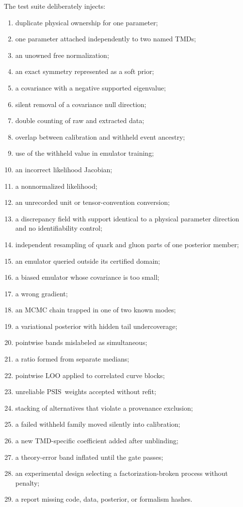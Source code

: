 \documentclass[11pt]{article}
\newcommand{\LOO}{\ensuremath{\mathrm{LOO}}}
\newcommand{\PSIS}{\ensuremath{\mathrm{PSIS}}}
\begin{document}
The test suite deliberately injects:
\begin{enumerate}
\item duplicate physical ownership for one parameter;
\item one parameter attached independently to two named TMDs;
\item an unowned free normalization;
\item an exact symmetry represented as a soft prior;
\item a covariance with a negative supported eigenvalue;
\item silent removal of a covariance null direction;
\item double counting of raw and extracted data;
\item overlap between calibration and withheld event ancestry;
\item use of the withheld value in emulator training;
\item an incorrect likelihood Jacobian;
\item a nonnormalized likelihood;
\item an unrecorded unit or tensor-convention conversion;
\item a discrepancy field with support identical to a physical parameter
direction and no identifiability control;
\item independent resampling of quark and gluon parts of one posterior member;
\item an emulator queried outside its certified domain;
\item a biased emulator whose covariance is too small;
\item a wrong gradient;
\item an MCMC chain trapped in one of two known modes;
\item a variational posterior with hidden tail undercoverage;
\item pointwise bands mislabeled as simultaneous;
\item a ratio formed from separate medians;
\item pointwise \(\LOO\) applied to correlated curve blocks;
\item unreliable \PSIS\ weights accepted without refit;
\item stacking of alternatives that violate a provenance exclusion;
\item a failed withheld family moved silently into calibration;
\item a new TMD-specific coefficient added after unblinding;
\item a theory-error band inflated until the gate passes;
\item an experimental design selecting a factorization-broken process without
penalty;
\item a report missing code, data, posterior, or formalism hashes.
\end{enumerate}
\end{document}
